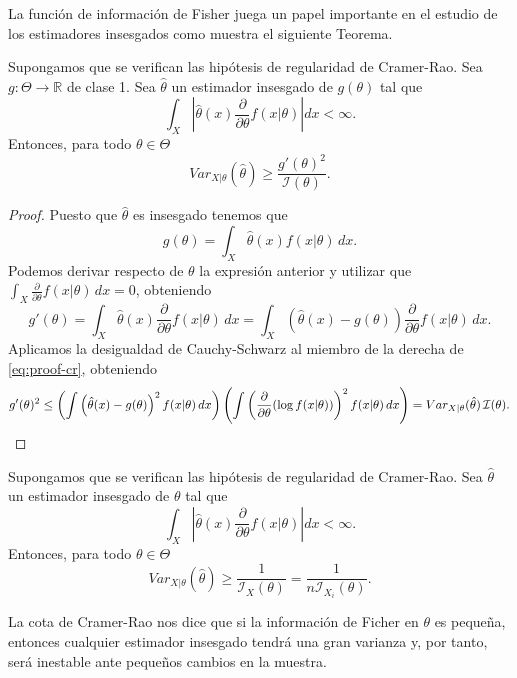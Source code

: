     La función de información de Fisher juega un papel importante en el estudio de los estimadores insesgados como muestra el siguiente Teorema.

    \begin{thm}
        Supongamos que se verifican las hipótesis de regularidad de Cramer-Rao. Sea $g: \Theta \to  \mathbb{R}$ de clase 1. Sea $\hat{\theta}$ un estimador insesgado de $g(\theta)$ tal que
        \[\int_X \left|\hat{\theta}(x) \frac{\partial}{\partial \theta}f(x | \theta)\right| dx < \infty.\]
        Entonces, para todo $\theta \in \Theta$
        \[Var_{X|\theta}(\hat{\theta}) \ge \frac{g'(\theta)^2}{\mathcal{I}(\theta)}.\]
    \end{thm}
    \begin{proof}
        Puesto que $\hat{\theta}$ es insesgado tenemos que
        \[g(\theta) = \int_X \hat{\theta}(x) f(x|\theta)\,dx.\]
        Podemos derivar respecto de $\theta$ la expresión anterior y utilizar que $\int_X \frac{\partial}{\partial \theta}f(x|\theta) \, dx = 0$, obteniendo
        \begin{equation}\label{eq:proof-cr}
        g'(\theta) = \int_X \hat{\theta}(x)\frac{\partial}{\partial \theta}f(x|\theta)\,dx = \int_X \left(\hat{\theta}(x) - g(\theta)\right)\frac{\partial}{\partial \theta}f(x|\theta)\,dx.
        \end{equation}
        Aplicamos la desigualdad de Cauchy-Schwarz al miembro de la derecha de \eqref{eq:proof-cr}, obteniendo
        \[g'(\theta)^2  \le \left( \int \left(\hat\theta(x) - g(\theta)\right)^2 f(x|\theta) \, dx \right) \left(\int \left( \frac{\partial}{\partial\theta} (\log f(x|\theta)) \right)^2 f(x|\theta) \, dx \right) = Var_{X|\theta}(\hat\theta) \, \mathcal{I}(\theta). \qedhere\]
    \end{proof}

    \begin{cor}
        Supongamos que se verifican las hipótesis de regularidad de Cramer-Rao. Sea $\hat{\theta}$ un estimador insesgado de $\theta$ tal que
        \[\int_X \left|\hat{\theta}(x) \frac{\partial}{\partial \theta} f(x | \theta)\right| dx < \infty.\]
        Entonces, para todo $\theta \in \Theta$
        \[Var_{X|\theta}(\hat{\theta}) \ge \frac{1}{\mathcal{I}_X(\theta)} = \frac{1}{n\mathcal{I}_{X_i}(\theta)}.\]
    \end{cor}

    La cota de Cramer-Rao nos dice que si la información de Ficher en $\theta$ es pequeña, entonces cualquier estimador insesgado tendrá una gran varianza y, por tanto, será inestable ante pequeños cambios en la muestra.

